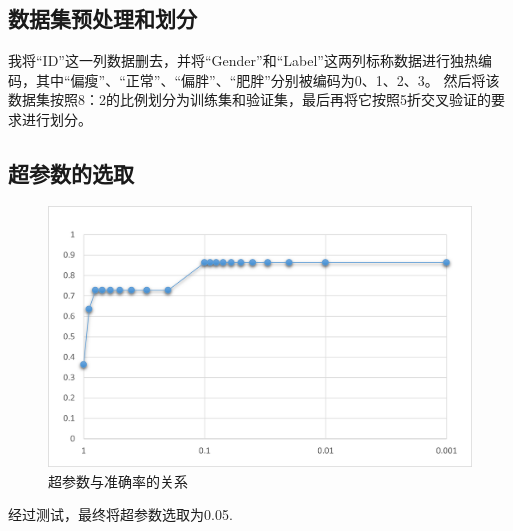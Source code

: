 \documentclass[a4paper,11pt]{article}%
\theoremstyle{remark}
\theoremstyle{remark}
\theoremstyle{definition}
\theoremstyle{definition}
\theoremstyle{definition}
\begin{document}
\subsection{数据集预处理和划分}
我将“ID”这一列数据删去，并将“Gender”和“Label”这两列标称数据进行独热编码，其中“偏瘦”、“正常”、“偏胖”、“肥胖”分别被编码为0、1、2、3。
然后将该数据集按照8：2的比例划分为训练集和验证集，最后再将它按照5折交叉验证的要求进行划分。
\subsection{超参数的选取}
\begin{figure}[htbp]
    \centering
    \includegraphics[scale=0.7]{pic.png}
    \caption{超参数与准确率的关系}
\end{figure}
经过测试，最终将超参数选取为0.05.
\end{document}
